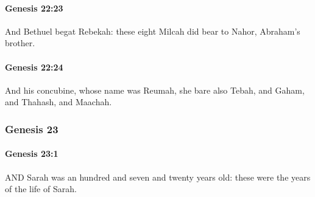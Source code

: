 		\paragraph{Genesis 22:23} %
			\label{GENESIS-22-23}

			And Bethuel begat Rebekah: these eight Milcah did bear to Nahor, Abraham's brother.


		\paragraph{Genesis 22:24} %
			\label{GENESIS-22-24}

			And his concubine, whose name was Reumah, she bare also Tebah, and Gaham, and Thahash, and Maachah.


	\subsubsection{Genesis 23} %
		\label{GENESIS-23}
		
		\paragraph{Genesis 23:1} %
			\label{GENESIS-23-1}

			AND Sarah was an hundred and seven and twenty years old: these were the years of the life of Sarah.


